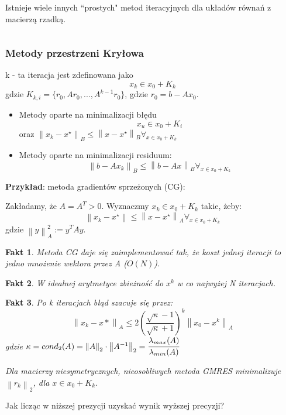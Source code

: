 \documentclass[hidelinks,a4paper]{article}
\newcommand{\norm}[1]{\left\lVert#1\right\rVert}
\newtheorem{fakt}{Fakt}
\begin{document}
Istnieje wiele innych ``prostych" metod iteracyjnych dla układów równań z macierzą rzadką.

$\quad$ 

\subsubsection{Metody przestrzeni Kryłowa}
k - ta iteracja jest zdefinowana jako
\[
	x_k \in x_0 + K_k
\]
gdzie $K_{k, i} = \{r_0, Ar_0, ..., A^{k-1}r_0\}$, gdzie $r_0 = b - Ax_0$.

\begin{itemize}
	\item Metody oparte na minimalizacji błędu
	      \[
	      	x_u \in x_0 + K_i
	      \]
	      oraz $\norm{x_k - x^\star}_B \leq \norm{x - x^\star}_B \forall_{x \in x_0 + K_k}$ 
	\item Metody oparte na minimalizacji residuum:
	      \[
	      	\norm{b - Ax_k}_B \leq \norm{b - Ax}_B \forall_{x \in x_0 + K_k}
	      \]
\end{itemize}
	
\textbf{Przykład}: metoda gradientów sprzeżonych (CG):

Zakładamy, że $A = A^T > 0$. Wyznaczmy $x_k \in x_0 + K_k$ takie, żeby:
\[
	\norm{x_k - x^\star} \leq \norm{x - x^\star}_A \forall_{x \in x_0 + K_k}
\]
gdzie $\norm{y}_A^2 := y^T A y$.	
	
\begin{fakt} Metoda CG daje się zaimplementować tak, że koszt jednej iteracji to jedno mnożenie wektora przez A ($O(N)$).
\end{fakt}	

\begin{fakt} W idealnej arytmetyce zbieżność do $x^k$ w co najwyżej N iteracjach.
\end{fakt}	

\begin{fakt} Po k iteracjach błąd szacuje się przez:
	\[
		\norm{x_k - x*} _A \leq 2 \left(\frac{\sqrt{\kappa} - 1}{\sqrt{\kappa} + 1}\right)^k \norm{x_0 - x^k}_A
	\]
	gdzie $\kappa = cond_2(A) = \norm{A} _2 \cdot \norm{A^{-1}}_2 = \cfrac{\lambda_{max}(A)}{\lambda_{min}(A)}$
	
	Dla macierzy niesymetrycznych, nieosobliwych metoda GMRES minimalizuje $\norm{r_k}_2$, dla $x \in x_0 + K_k$.
\end{fakt}

Jak licząc w niższej prezycji uzyskać wynik wyższej precyzji?
\end{document}
